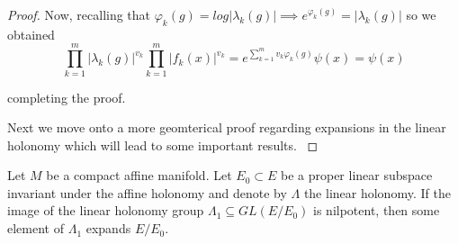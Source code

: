 \begin{proof}
    Now, recalling that $ \varphi_k(g) = log|\lambda_k(g)| \implies
        e^{\varphi_k(g)}= |\lambda_k(g)|$ so we obtained
    \[ \prod_{k=1}^{m}|\lambda_k(g)|^{v_k}\prod_{k=1}^{m}|f_k(x)|^{v_k} = e^{\sum_{k=1}^{m}v_k\varphi_k(g)}\psi(x) = \psi(x)\]

    completing the proof.

    Next we move onto a more geomterical proof regarding expansions in the linear
    holonomy which will lead to some important results. \label{lemma:exists-map}
\end{proof}

\begin{theorem}
    Let $M$ be a compact affine manifold. Let $E_0 \subset E$ be a proper linear subspace invariant
    under the affine holonomy and denote by $\Lambda$ the linear holonomy. If the image of the linear holonomy group $\Lambda_1 \subseteq GL(E/E_0)$ is nilpotent,
    then some element of $\Lambda_1$ expands $E/E_0$.
\end{theorem}

